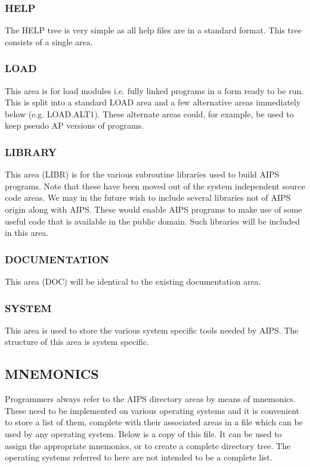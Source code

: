 \subsubsection{ HELP }

The HELP tree is very simple as all help files are in a standard format.
This tree consists of a single area.

\subsubsection{ LOAD }

This area is for load modules i.e. fully linked programs in a form ready
to be run. This is split into a standard LOAD area and a few alternative
areas immediately below (e.g. LOAD.ALT1). These alternate areas could,
for example, be used to keep pseudo AP versions of programs.

\subsubsection{ LIBRARY }

This area (LIBR) is for the various subroutine libraries used to build
AIPS programs. Note that these have been moved out of the system
independent source code areas. We may in the future wish to include
several libraries not of AIPS origin along with AIPS. These would enable
AIPS programs to make use of some useful code that is available in the
public domain. Such libraries will be included in this area.

\subsubsection{ DOCUMENTATION }

This area (DOC) will be identical to the existing documentation area.

\subsubsection{ SYSTEM }

This area is used to store the various system specific tools needed by
AIPS. The structure of this area is system specific.

\subsection{ MNEMONICS }

Programmers always refer to the AIPS directory areas by means of
mnemonics. These need to be implemented on various operating systems
and it is convenient to store a list of them, complete with their
associated areas in a file which can be used by any operating system.
Below is a copy of this file. It can be used to assign the appropriate
mnemonics, or to create a complete directory tree. The operating systems
referred to here are not intended to be a complete list.

